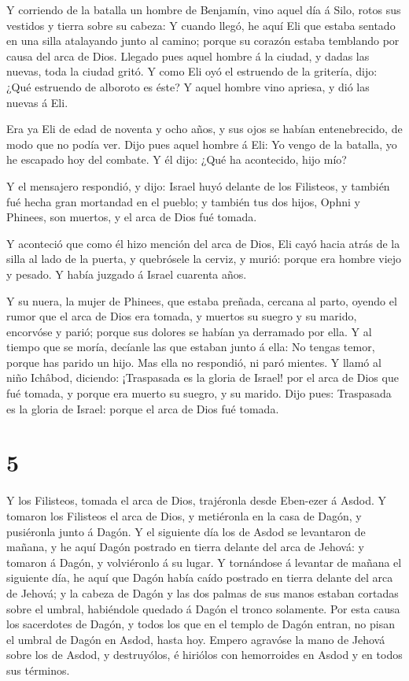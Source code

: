  Y corriendo de la batalla un hombre de Benjamín, vino
aquel día á Silo, rotos sus vestidos y tierra sobre su cabeza:
 Y cuando llegó, he aquí Eli que estaba sentado en una
silla atalayando junto al camino; porque su corazón estaba temblando por
causa del arca de Dios. Llegado pues aquel hombre á la ciudad, y dadas
las nuevas, toda la ciudad gritó.  Y como Eli oyó el
estruendo de la gritería, dijo: ¿Qué estruendo de alboroto es éste? Y
aquel hombre vino apriesa, y dió las nuevas á Eli.

 Era ya Eli de edad de noventa y ocho años, y sus ojos se
habían entenebrecido, de modo que no podía ver.  Dijo pues
aquel hombre á Eli: Yo vengo de la batalla, yo he escapado hoy del
combate. Y él dijo: ¿Qué ha acontecido, hijo mío?

 Y el mensajero respondió, y dijo: Israel huyó delante de
los Filisteos, y también fué hecha gran mortandad en el pueblo; y
también tus dos hijos, Ophni y Phinees, son muertos, y el arca de Dios
fué tomada.

 Y aconteció que como él hizo mención del arca de Dios, Eli
cayó hacia atrás de la silla al lado de la puerta, y quebrósele la
cerviz, y murió: porque era hombre viejo y pesado. Y había juzgado á
Israel cuarenta años.

 Y su nuera, la mujer de Phinees, que estaba preñada,
cercana al parto, oyendo el rumor que el arca de Dios era tomada, y
muertos su suegro y su marido, encorvóse y parió; porque sus dolores se
habían ya derramado por ella.  Y al tiempo que se moría,
decíanle las que estaban junto á ella: No tengas temor, porque has
parido un hijo. Mas ella no respondió, ni paró mientes.  Y
llamó al niño Ichâbod, diciendo: ¡Traspasada es la gloria de Israel! por
el arca de Dios que fué tomada, y porque era muerto su suegro, y su
marido.  Dijo pues: Traspasada es la gloria de Israel:
porque el arca de Dios fué tomada.

\hypertarget{section-4}{%
\section{5}\label{section-4}}

 Y los Filisteos, tomada el arca de Dios, trajéronla desde
Eben-ezer á Asdod.  Y tomaron los Filisteos el arca de Dios,
y metiéronla en la casa de Dagón, y pusiéronla junto á Dagón.
 Y el siguiente día los de Asdod se levantaron de mañana, y
he aquí Dagón postrado en tierra delante del arca de Jehová: y tomaron á
Dagón, y volviéronlo á su lugar.  Y tornándose á levantar de
mañana el siguiente día, he aquí que Dagón había caído postrado en
tierra delante del arca de Jehová; y la cabeza de Dagón y las dos palmas
de sus manos estaban cortadas sobre el umbral, habiéndole quedado á
Dagón el tronco solamente.  Por esta causa los sacerdotes de
Dagón, y todos los que en el templo de Dagón entran, no pisan el umbral
de Dagón en Asdod, hasta hoy.  Empero agravóse la mano de
Jehová sobre los de Asdod, y destruyólos, é hiriólos con hemorroides en
Asdod y en todos sus términos.

